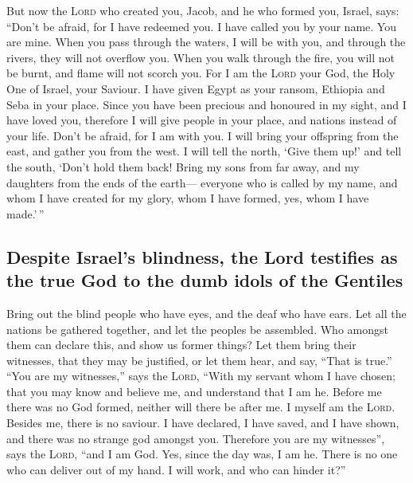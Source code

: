  But now the \textsc{Lord} who created you, Jacob, and he
who formed you, Israel, says: ``Don't be afraid, for I have redeemed
you. I have called you by your name. You are mine.  When
you pass through the waters, I will be with you, and through the rivers,
they will not overflow you. When you walk through the fire, you will not
be burnt, and flame will not scorch you.  For I am the
\textsc{Lord} your God, the Holy One of Israel, your Saviour. I have
given Egypt as your ransom, Ethiopia and Seba in your place.
 Since you have been precious and honoured in my sight,
and I have loved you, therefore I will give people in your place, and
nations instead of your life.  Don't be afraid, for I am
with you. I will bring your offspring from the east, and gather you from
the west.  I will tell the north, `Give them up!' and tell
the south, `Don't hold them back! Bring my sons from far away, and my
daughters from the ends of the earth---  everyone who is
called by my name, and whom I have created for my glory, whom I have
formed, yes, whom I have made.'\,''

\hypertarget{despite-israels-blindness-the-lord-testifies-as-the-true-god-to-the-dumb-idols-of-the-gentiles}{%
\subsection{Despite Israel's blindness, the Lord testifies as the true
God to the dumb idols of the
Gentiles}\label{despite-israels-blindness-the-lord-testifies-as-the-true-god-to-the-dumb-idols-of-the-gentiles}}

 Bring out the blind people who have eyes, and the deaf
who have ears.  Let all the nations be gathered together,
and let the peoples be assembled. Who amongst them can declare this, and
show us former things? Let them bring their witnesses, that they may be
justified, or let them hear, and say, ``That is true.'' 
``You are my witnesses,'' says the \textsc{Lord}, ``With my servant whom
I have chosen; that you may know and believe me, and understand that I
am he. Before me there was no God formed, neither will there be after
me.  I myself am the \textsc{Lord}. Besides me, there is
no saviour.  I have declared, I have saved, and I have
shown, and there was no strange god amongst you. Therefore you are my
witnesses'', says the \textsc{Lord}, ``and I am God. 
Yes, since the day was, I am he. There is no one who can deliver out of
my hand. I will work, and who can hinder it?''

